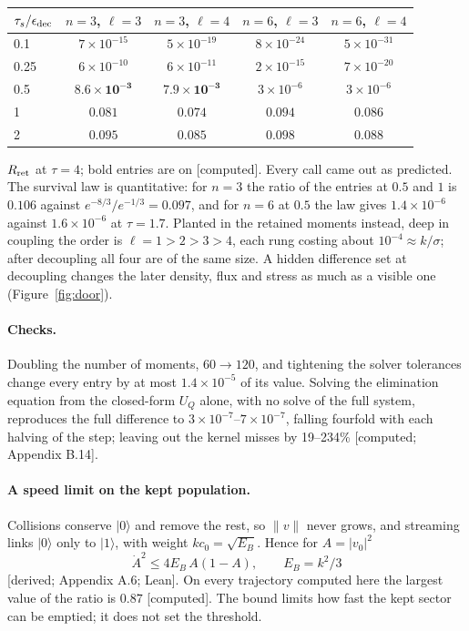 \documentclass[11pt]{article}
\newcommand{\grade}[1]{\textsf{\small[#1]}}
\begin{document}
\begin{center}\begin{tabular}{lcccc}\toprule
$\tau_s/\epsilon_{\rm dec}$ & $n=3$, $\ell=3$ & $n=3$, $\ell=4$ & $n=6$, $\ell=3$ & $n=6$, $\ell=4$\\\midrule
0.1 & $7\times10^{-15}$ & $5\times10^{-19}$ & $8\times10^{-24}$ & $5\times10^{-31}$\\
0.25 & $6\times10^{-10}$ & $6\times10^{-11}$ & $2\times10^{-15}$ & $7\times10^{-20}$\\
0.5 & $\mathbf{8.6\times10^{-3}}$ & $\mathbf{7.9\times10^{-3}}$ & $3\times10^{-6}$ & $3\times10^{-6}$\\
1 & $\mathbf{0.081}$ & $\mathbf{0.074}$ & $\mathbf{0.094}$ & $\mathbf{0.086}$\\
2 & $\mathbf{0.095}$ & $\mathbf{0.085}$ & $\mathbf{0.098}$ & $\mathbf{0.088}$\\\bottomrule\end{tabular}\end{center}
$R_{\rm ret}$ at $\tau=4$; bold entries are on \grade{computed}. Every call came out as predicted. The survival law is quantitative: for $n=3$ the ratio of the entries at $0.5$ and $1$ is $0.106$ against $e^{-8/3}/e^{-1/3}=0.097$, and for $n=6$ at $0.5$ the law gives $1.4\times10^{-6}$ against $1.6\times10^{-6}$ at $\tau=1.7$. Planted in the retained moments instead, deep in coupling the order is $\ell=1>2>3>4$, each rung costing about $10^{-4}\approx k/\sigma$; after decoupling all four are of the same size. A hidden difference set at decoupling changes the later density, flux and stress as much as a visible one (Figure~\ref{fig:door}).

\paragraph{Checks.} Doubling the number of moments, $60\to120$, and tightening the solver tolerances change every entry by at most $1.4\times10^{-5}$ of its value. Solving the elimination equation from the closed-form $U_Q$ alone, with no solve of the full system, reproduces the full difference to $3\times10^{-7}$--$7\times10^{-7}$, falling fourfold with each halving of the step; leaving out the kernel misses by 19--234\% \grade{computed; Appendix B.14}.

\paragraph{A speed limit on the kept population.} Collisions conserve $|0\rangle$ and remove the rest, so $\lVert v\rVert$ never grows, and streaming links $|0\rangle$ only to $|1\rangle$, with weight $kc_0=\sqrt{E_B}$. Hence for $A=|v_0|^2$
\begin{equation}
\dot A^2\le4E_B\,A(1-A),\qquad E_B=k^2/3
\end{equation}
\grade{derived; Appendix A.6; Lean}. On every trajectory computed here the largest value of the ratio is $0.87$ \grade{computed}. The bound limits how fast the kept sector can be emptied; it does not set the threshold.
\end{document}

